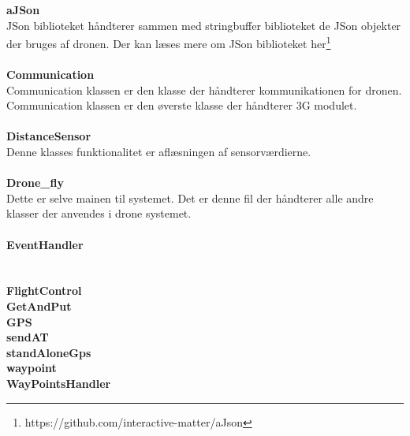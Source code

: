 \textbf{aJSon}\\
JSon biblioteket håndterer sammen med stringbuffer biblioteket de JSon objekter der bruges af dronen. Der kan læses mere om JSon biblioteket her\footnote{https://github.com/interactive-matter/aJson} \\ \\
\textbf{Communication}\\
Communication klassen er den klasse der håndterer kommunikationen for dronen. Communication klassen er den øverste klasse der håndterer 3G modulet. \\ \\
\textbf{DistanceSensor}\\
Denne klasses funktionalitet er aflæsningen af sensorværdierne. \\ \\
\textbf{Drone\_fly}\\
Dette er selve mainen til systemet. Det er denne fil der håndterer alle andre klasser der anvendes i drone systemet. \\ \\
\textbf{EventHandler}\\
\\ \\
\textbf{FlightControl}\\
\textbf{GetAndPut}\\
\textbf{GPS}\\
\textbf{sendAT}\\
\textbf{standAloneGps}\\
\textbf{waypoint}\\
\textbf{WayPointsHandler}\\

